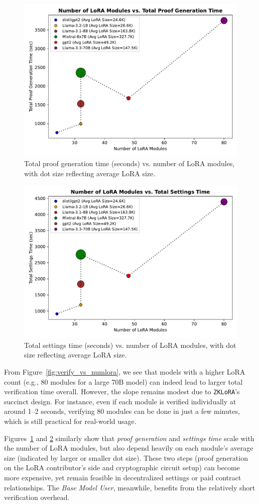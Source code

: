\documentclass[11pt]{article}
\begin{document}
\begin{figure}[ht]
    \centering
    \includegraphics[width=0.65\linewidth]{figs/fig_proof_vs_numlora.pdf}
    \caption{Total proof generation time (seconds) vs. number of LoRA modules, with dot size reflecting average LoRA size.}
    \label{fig:proof_vs_numlora}
\end{figure}

\begin{figure}[ht]
    \centering
    \includegraphics[width=0.65\linewidth]{figs/fig_settings_vs_numlora.pdf}
    \caption{Total settings time (seconds) vs. number of LoRA modules, with dot size reflecting average LoRA size.}
    \label{fig:settings_vs_numlora}
\end{figure}

From Figure~\ref{fig:verify_vs_numlora}, we see that models with a higher LoRA count (e.g., 80 modules for a large 70B model) can indeed lead to larger total verification time overall. However, the slope remains modest due to \texttt{ZKLoRA}’s succinct design. For instance, even if each module is verified individually at around 1--2 seconds, verifying 80 modules can be done in just a few minutes, which is still practical for real-world usage.

Figures~\ref{fig:proof_vs_numlora} and \ref{fig:settings_vs_numlora} similarly show that \emph{proof generation} and \emph{settings time} scale with the number of LoRA modules, but also depend heavily on each module’s average size (indicated by larger or smaller dot size). These two steps (proof generation on the LoRA contributor’s side and cryptographic circuit setup) can become more expensive, yet remain feasible in decentralized settings or paid contract relationships. The \emph{Base Model User}, meanwhile, benefits from the relatively short verification overhead.
\end{document}
